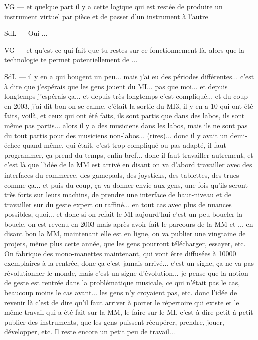 VG — et quelque part il y a cette logique qui est restée de produire un instrument virtuel par pièce et de passer d'un instrument à l'autre 

SdL — Oui ... 

VG — et qu'est ce qui fait que tu restes sur ce fonctionnement là, alors que la technologie te permet potentiellement de ... 

SdL — il y en a qui bougent un peu... mais j'ai eu des périodes différentes... c'est à dire que j'espérais que les gens jouent du MI... pas que moi... et depuis longtemps j'espérais ça... et depuis très longtemps c'est compliqué... et du coup en 2003, j'ai dit bon on se calme, c'était la sortie du MI3, il y en a 10 qui ont été faits, voilà, et ceux qui ont été faits, ils sont partis que dans des labos, ils sont même pas partis... alors il y a des musiciens dans les labos, mais ils ne sont pas du tout partis pour des musiciens non-labos... (rires)... donc il y avait un demi-échec quand même, qui était, c'est trop compliqué ou pas adapté, il faut programmer, ça prend du temps, enfin bref... donc il faut travailler autrement, et c'est là que l'idée de la MM est arrivé en disant on va d'abord travailler avec des interfaces du commerce, des gamepads, des joysticks, des tablettes, des trucs comme ça... et puis du coup, ça va donner envie aux gens, une fois qu'ils seront très forts sur leurs machins, de prendre une interface de haut-niveau et de travailler sur du geste expert ou raffiné... en tout cas avec plus de nuances possibles, quoi... et donc si on refait le MI aujourd'hui c'est un peu boucler la boucle, on est revenu en 2003 mais après avoir fait le parcours de la MM et ... en disant bon la MM, maintenant elle est en ligne, on va publier une vingtaine de projets, même plus cette année, que les gens pourront télécharger, essayer, etc. On fabrique des mono-manettes maintenant, qui vont être diffusées à 10000 exemplaires à la rentrée, donc ça c'est jamais arrivé... c'est un signe, ça ne va pas révolutionner le monde, mais c'est un signe d'évolution... je pense que la notion de geste est rentrée dans la problématique musicale, ce qui n'était pas le cas, beaucoup moins le cas avant... les gens n'y croyaient pas, etc. donc l'idée de revenir là c'est de dire qu'il faut arriver à porter le répertoire qui existe et le même travail qui a été fait sur la MM, le faire sur le MI, c'est à dire petit à petit publier des instruments, que les gens puissent récupérer, prendre, jouer, développer, etc. Il reste encore un petit peu de travail...  


